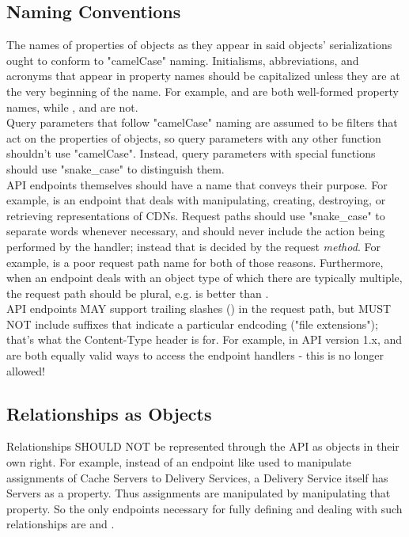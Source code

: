 \subsection{Naming Conventions}
The names of properties of objects as they appear in said objects' serializations ought to conform to "camelCase" naming. Initialisms,
abbreviations, and acronyms that appear in property names should be capitalized unless they are at the very beginning of the name. For
example,  and  are both well-formed property names, while ,  and
 are not.\\
Query parameters that follow "camelCase" naming are assumed to be filters that act on the properties of objects, so query parameters with
any other function shouldn't use "camelCase". Instead, query parameters with special functions should use "snake\_case" to distinguish them.\\
API endpoints themselves should have a name that conveys their purpose. For example,  is an endpoint that deals with manipulating,
creating, destroying, or retrieving representations of CDNs. Request paths should use "snake\_case" to separate words whenever necessary, and
should never include the action being performed by the handler; instead that is decided by the request \emph{method}. For example,
 is a poor request path name for both of those reasons. Furthermore, when an endpoint deals with an object type of
which there are typically multiple, the request path should be plural, e.g.  is better than .\\
API endpoints MAY support trailing slashes (\code{/}) in the request path, but MUST NOT include suffixes that indicate a particular endcoding
("file extensions"); that's what the Content-Type header is for. For example, in API version 1.x,  and  are both
equally valid ways to access the  endpoint handlers - this is no longer allowed!

\subsection{Relationships as Objects}
Relationships SHOULD NOT be represented through the API as objects in their own right. For example, instead of an endpoint like
 used to manipulate assignments of Cache Servers to Delivery Services, a Delivery Service itself
has Servers as a property. Thus assignments are manipulated by manipulating that property. So the only endpoints necessary for fully
defining and dealing with such relationships are  and .
